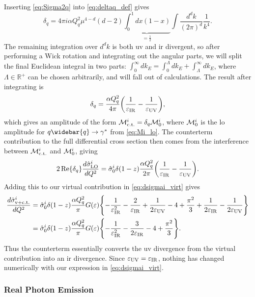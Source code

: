 Inserting \cref{eq:Sigma2q} into \cref{eq:deltaq_def} gives
\begin{equation}
    \delta_q = 4\pi i\alpha Q_q^2\mu^{4-d} (d-2) \underbrace{\int_0^1 dx(1-x)}_{=\frac{1}{2}} \int\frac{d^dk}{(2\pi)^d}\frac{1}{k^4}.
\end{equation}
The remaining integration over $d^dk$ is both \gls{uv} and \gls{ir} divergent, so after performing a Wick rotation and integrating out the angular parts, we will split the final Euclidean integral in two parts: $\int_0^\infty dk_E = \int_0^\Lambda dk_E + \int_\Lambda^\infty dk_E$, where $\Lambda \in \mathbb{R}^+$ can be chosen arbitrarily, and will fall out of calculations.
The result after integrating is
\begin{equation}
    \delta_q = \frac{\alpha Q_q^2}{4\pi} \biggl( \frac{1}{\varepsilon_{\mathrm{IR}}} - \frac{1}{\varepsilon_{\mathrm{UV}}} \biggr),
\end{equation}
which gives an amplitude of the form $\mathcal{M}^i_{\mathrm{c.t.}}=\delta_q\mathcal{M}^i_0$, where $\mathcal{M}^i_0$ is the \gls{lo} amplitude for $q\widebar{q}\to\gamma^*$ from \cref{eq:Mi_lo}.
The counterterm contribution to the full differential cross section then comes from the interference between $\mathcal{M}^i_{\mathrm{c.t.}}$ and $\mathcal{M}^i_0$, giving
\begin{equation}\label{eq:dsigmai_ct}
    2\operatorname{Re}\{ \delta_q \} \frac{d\hat\sigma^i_{\mathrm{LO}}}{dQ^2} = \hat\sigma^i_0 \delta(1-z) \frac{\alpha Q_q^2}{2\pi} \biggl( \frac{1}{\varepsilon_{\mathrm{IR}}} - \frac{1}{\varepsilon_{\mathrm{UV}}} \biggr).
\end{equation}
Adding this to our virtual contribution in \cref{eq:dsigmai_virt} gives
\begin{align}
    \frac{d\hat\sigma^i_{\mathrm{v+c.t.}}}{dQ^2} &= \hat\sigma^i_0 \delta(1-z) \frac{\alpha Q_q^2}{\pi} G(\varepsilon)
    \Biggl\{
        -\frac{1}{\varepsilon_{\mathrm{IR}}^2} - \frac{2}{\varepsilon_{\mathrm{IR}}} + \frac{1}{2\varepsilon_{\mathrm{UV}}} - 4 + \frac{\pi^2}{3} + \frac{1}{2\varepsilon_{\mathrm{IR}}} - \frac{1}{2\varepsilon_{\mathrm{UV}}}
    \Biggr\}
    \nonumber \\
    &= \hat\sigma^i_0 \delta(1-z) \frac{\alpha Q_q^2}{\pi} G(\varepsilon)
    \Biggl\{
        -\frac{1}{\varepsilon_{\mathrm{IR}}^2} - \frac{3}{2\varepsilon_{\mathrm{IR}}} - 4 + \frac{\pi^2}{3}
    \Biggr\}.
    \label{eq:dsigmai_virt_ct}
\end{align}
Thus the counterterm essentially converts the \gls{uv} divergence from the virtual contribution into an \gls{ir} divergence. Since $\varepsilon_{\mathrm{UV}}=\varepsilon_{\mathrm{IR}}$, nothing has changed numerically with our expression in \cref{eq:dsigmai_virt}.


\subsubsection{Real Photon Emission}

